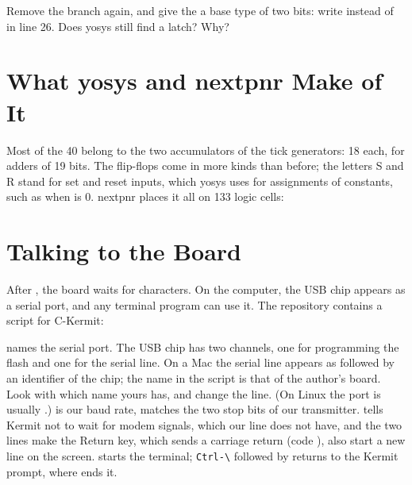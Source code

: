 \begin{exercise}
\label{ex:step06-enum}
Remove the  branch again, and give the  a base
type of two bits: write  instead of
 in line 26. Does yosys still find a latch? Why?
\end{exercise}

\section{What yosys and nextpnr Make of It}


Most of the 40  belong to the two accumulators of the tick
generators: 18 each, for adders of 19 bits. The flip-flops come in more kinds
than before; the letters S and R stand for set and reset inputs, which yosys
uses for assignments of constants, such as  when
 is 0. nextpnr places it all on 133 logic cells:


\section{Talking to the Board}
\label{sec:step06-kermit}

After , the board waits for characters. On the computer, the
USB chip appears as a serial port, and any terminal program can use it. The
repository contains a script for C-Kermit:

\par\noindent\begin{minipage}{\linewidth}

\end{minipage}\par

 names the serial port. The USB chip has two channels, one for
programming the flash and one for the serial line. On a Mac the serial line
appears as  followed by an identifier of the chip; the
name in the script is that of the author's board. Look with
 which name yours has, and change the line. (On Linux the port is usually
.)  is our baud rate,  matches the two stop bits of our transmitter.  tells
Kermit not to wait for modem signals, which our line does not have, and the
two  lines make the Return key, which sends a carriage return
(code ), also start a new line on the screen.  starts the
terminal; \texttt{Ctrl-\textbackslash} followed by  returns to the Kermit
prompt, where  ends it.

